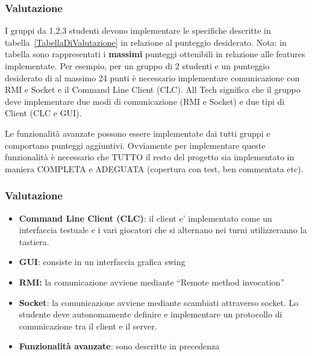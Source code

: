 \documentclass{beamer}
\begin{document}
\begin{frame}
\frametitle{Valutazione}
I gruppi da 1,2,3 studenti devono implementare  le specifiche
descritte in tabella~\ref{TabellaDiValutazione} in relazione al
punteggio desiderato. Nota: in tabella sono rappresentati i
\textbf{massimi} punteggi ottenibili in relazione alle features
implementate. Per esempio, per un gruppo di 2 studenti e un punteggio
desiderato di al massimo 24 punti \`e necessario implementare
comunicazione con RMI e Socket e il Command Line Client (CLC).
All Tech significa che il gruppo deve implementare due modi di
comunicazione (RMI e Socket) e due tipi di Client (CLC e GUI).

Le funzionalit\`a avanzate possono essere implementate dai tutti gruppi e comportano punteggi aggiuntivi. Ovviamente per implementare queste funzionalit\`a \`e necessario che TUTTO il resto del progetto sia implementato in maniera COMPLETA e ADEGUATA (copertura con test, ben commentata etc).
\end{frame}



\begin{frame}
\frametitle{Valutazione}
\begin{itemize}
\item \textbf{Command Line Client (CLC)}: il client e' implementato come un interfaccia testuale e i vari giocatori che si alternano nei turni utilizzeranno la tastiera.
\item \textbf{GUI}: consiste in un interfaccia grafica swing
\item \textbf{RMI:} la comunicazione avviene mediante ``Remote method invocation''
\item \textbf{Socket}: la comunicazione avviene mediante scambiati
  attraverso socket. Lo studente deve autonomamente definire e
  implementare un protocollo di comunicazione tra il client e il
  server.
\item \textbf{Funzionalit\`a avanzate}: sono descritte in precedenza
\end{itemize}
\end{frame}
\end{document}
